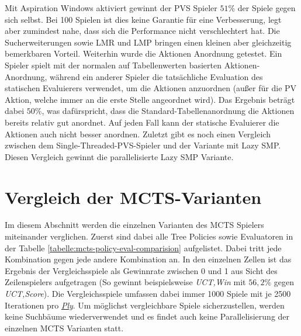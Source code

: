 Mit Aspiration Windows aktiviert gewinnt der \ac{PVS} Spieler $51\%$ der Spiele gegen sich selbst. Bei 100 Spielen ist dies keine Garantie für eine Verbesserung, legt aber zumindest nahe, dass sich die Performance nicht verschlechtert hat. Die Sucherweiterungen sowie \ac{LMR} und \ac{LMP} bringen einen kleinen aber gleichzeitig bemerkbaren Vorteil. Weiterhin wurde die Aktionen Anordnung getestet. Ein Spieler spielt mit der normalen auf Tabellenwerten basierten Aktionen-Anordnung, während ein anderer Spieler die tatsächliche Evaluation des statischen Evaluierers verwendet, um die Aktionen anzuordnen (außer für die \ac{PV} Aktion, welche immer an die erste Stelle angeordnet wird). Das Ergebnis beträgt dabei $50\%$, was dafürspricht, dass die Standard-Tabellenanordnung die Aktionen bereits relativ gut anordnet. Auf jeden Fall kann der statische Evaluierer die Aktionen auch nicht besser anordnen. Zuletzt gibt es noch einen Vergleich zwischen dem Single-Threaded-\ac{PVS}-Spieler und der Variante mit Lazy \ac{SMP}. Diesen Vergleich gewinnt die parallelisierte Lazy \ac{SMP} Variante.

\section{Vergleich der MCTS-Varianten}

Im diesem Abschnitt werden die einzelnen Varianten des \ac{MCTS} Spielers miteinander verglichen. Zuerst sind dabei alle Tree Policies sowie Evaluatoren in der Tabelle \ref{tabelle:mcts-policy-eval-comparision} aufgelistet. Dabei tritt jede Kombination gegen jede andere Kombination an. In den einzelnen Zellen ist das Ergebnis der Vergleichsspiele als Gewinnrate zwischen 0 und 1 aus Sicht des Zeilenspielers aufgetragen (So gewinnt beispielsweise \emph{\acs{UCT},Win} mit $56{,}2\%$ gegen \emph{\acs{UCT},Score}). Die Vergleichsspiele umfassen dabei immer 1000 Spiele mit je 2500 Iterationen pro \hyperref[text:ply]{\emph{Ply}}. Um möglichst vergleichbare Spiele sicherzustellen, werden keine Suchbäume wiederverwendet und es findet auch keine Parallelisierung der einzelnen \ac{MCTS} Varianten statt.

